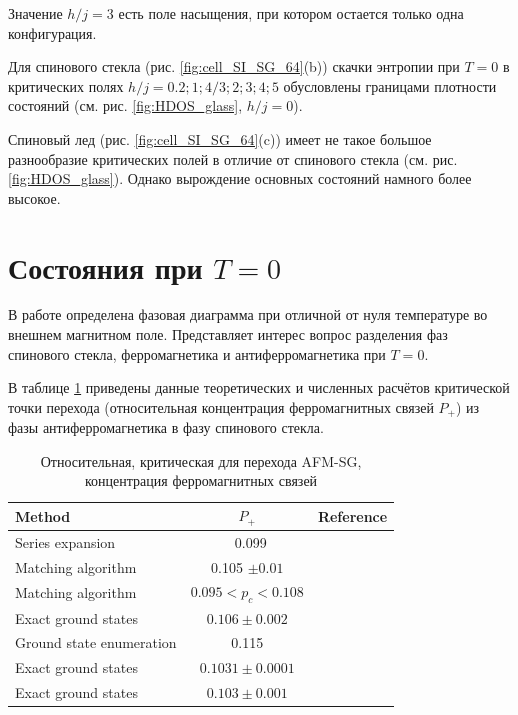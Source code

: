 \documentclass[utf8, babel, sor, jor, amsmath, amssymb, reprint]{elsarticle} %
\begin{document}
Значение  $h/j=3$ есть поле насыщения, при котором остается только одна конфигурация.


Для спинового стекла (рис. \ref{fig:cell_SI_SG_64}(b)) скачки энтропии при $T=0$ в критических полях $h/j=0.2; 1; 4/3; 2; 3; 4; 5$ обусловлены границами плотности состояний (см. рис. \ref{fig:HDOS_glass}, $h/j=0$).


Спиновый лед (рис. \ref{fig:cell_SI_SG_64}(c)) имеет не такое большое разнообразие критических полей в отличие от спинового стекла (см. рис. \ref{fig:HDOS_glass}). Однако вырождение основных состояний намного более высокое.


\section{Состояния при $T = 0$}

В работе \cite{trukhin4855337thermodynamic} определена фазовая диаграмма при отличной от нуля температуре во внешнем магнитном поле. Представляет интерес вопрос разделения фаз спинового стекла, ферромагнетика и антиферромагнетика при $T=0$.

В таблице \ref{tab:lit_phase} приведены данные теоретических и численных расчётов критической точки перехода (относительная концентрация ферромагнитных связей $P_+$) из фазы антиферромагнетика в фазу спинового стекла.

\begin{table}[!h]
	\begin{tabular}{|l|c|l|}
		\hline
		Method                                   & $P_{+}$                                       & Reference                                           
		\\ \hline
		Series expansion 								& ~0.099                                  & \cite{PhysRevB.19.260}    \\ \hline
	     Matching algorithm                            & 
	     0.105 $\pm 0.01$                                        & \cite{H_Freund_1989} \\ \hline
		Matching algorithm                      & 
		$0.095<p_c<0.108$                                          & \cite{BENDISCH1994139}      \\ \hline
		Exact ground states                       & 
		$0.106 \pm 0.002$                               & \cite{N.Kawashima_1997}     \\ \hline
		Ground state enumeration                             & 0.115                                          & \cite{PhysRevE.58.1502} \\ \hline
    	Exact ground states        & 
		$0.1031\pm0.0001$                                          & \cite{WANG200331}   \\ \hline
		Exact ground states   & $0.103\pm0.001$                                       & \cite{amoruso2004domain} 
		    \\ \hline
			
	\end{tabular}
	\caption{Относительная, критическая для перехода AFM-SG, концентрация ферромагнитных связей}
	\label{tab:lit_phase}
\end{table}
\end{document}
